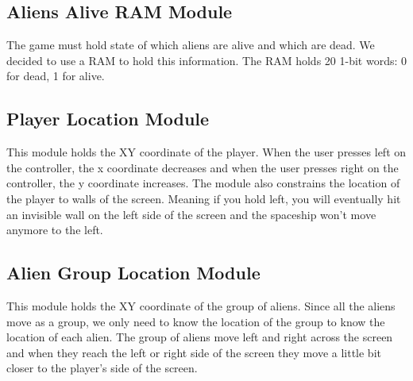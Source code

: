 \documentclass[11pt, titlepage]{article}
\begin{document}
        \subsection{Aliens Alive RAM Module}
            The game must hold state of which aliens are alive and which are dead. We decided to use a RAM to hold this information. The RAM holds 20 1-bit words: 0 for dead, 1 for alive.

        \subsection{Player Location Module}
            This module holds the XY coordinate of the player. When the user presses left on the controller, the x coordinate decreases and when the user presses right on the controller, the y coordinate increases. The module also constrains the location of the player to walls of the screen. Meaning if you hold left, you will eventually hit an invisible wall on the left side of the screen and the spaceship won't move anymore to the left.

        \subsection{Alien Group Location Module}
            This module holds the XY coordinate of the group of aliens. Since all the aliens move as a group, we only need to know the location of the group to know the location of each alien. The group of aliens move left and right across the screen and when they reach the left or right side of the screen they move a little bit closer to the player's side of the screen.
\end{document}
